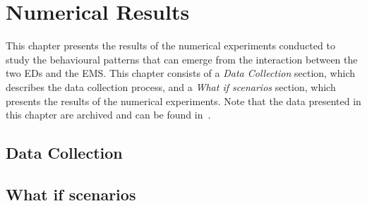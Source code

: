 \chapter{Numerical Results}\label{sec:numerical_results}

This chapter presents the results of the numerical experiments conducted to
study the behavioural patterns that can emerge from the interaction between the
two EDs and the EMS.
This chapter consists of a \textit{Data Collection} section, which describes the
data collection process, and a \textit{What if scenarios} section, which
presents the results of the numerical experiments.
Note that the data presented in this chapter are archived and can be found
in~\cite{michalis_panayides_2023_7501988}.


\section{Data Collection}\label{sec:data_collection}


\section{What if scenarios}\label{sec:results_what_if}

